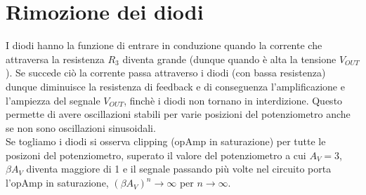 \documentclass[10pt,a4paper]{article}
\begin{document}
\section{Rimozione dei diodi}
I diodi hanno la funzione di entrare in conduzione quando la corrente che attraversa la resistenza $R_3$ diventa grande (dunque quando è alta la tensione $V_{OUT}$). Se succede ciò la corrente passa attraverso i diodi (con bassa resistenza) dunque diminuisce la resistenza di feedback e di conseguenza l'amplificazione e l'ampiezza del segnale $V_{OUT}$, finchè i diodi non tornano in interdizione. Questo permette di avere oscillazioni stabili per varie posizioni del potenziometro anche se non sono oscillazioni sinusoidali.\\
Se togliamo i diodi si osserva clipping (opAmp in saturazione) per tutte le posizoni del potenziometro, superato il valore del potenziometro a cui $A_V = 3$, $\beta A_V$ diventa maggiore di 1 e il segnale passando più volte nel circuito porta l'opAmp in saturazione, $(\beta A_V)^n \rightarrow \infty$ per $n \rightarrow  \infty$.\\
\end{document}
